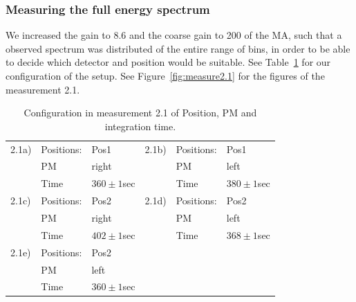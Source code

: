 \subsubsection{Measuring the full energy spectrum}
\label{ssub:Measuring the full energy spectrum}
We increased the gain to 8.6 and the coarse gain to 200 of the MA, such that a observed spectrum 
was distributed of the entire range of bins, in order to be able to decide which detector and position would
be suitable. See Table~\ref{tab:config2} for our configuration of the setup. See
Figure~\ref{fig:measure2.1} for the figures of the measurement 2.1.
\begin{table}[htp]
    \begin{tabular}{|l|l|l||l|l|l|}
        \hline
        2.1a) & Positions:  & Pos1         & 2.1b) & Positions:  & Pos1\\
              & PM          & right        &       & PM          & left \\
              & Time        & $360\pm1$sec &       & Time        & $380\pm1$sec \\
        \hline 
        2.1c) & Positions:  & Pos2         & 2.1d) & Positions:  & Pos2         \\
              & PM          & right        &       & PM          & left \\
              & Time        & $402\pm1$sec &       & Time        & $368\pm1$sec \\
        \hline 
        2.1e) & Positions:  & Pos2         \\
              & PM          & left \\
              & Time        & $360\pm1$sec \\
    \cline{1-3}
    \end{tabular}
  \caption{Configuration in measurement 2.1 of Position, PM and integration time.}
    \label{tab:config2}
\end{table}


